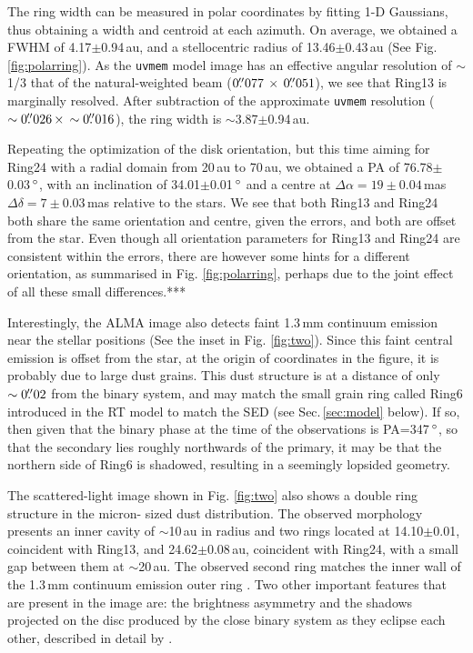 \documentclass[letters,usenatbib,times]{mnras}
\begin{document}
The ring width can be measured in polar coordinates by fitting 1-D Gaussians, thus obtaining a width and centroid at each azimuth. On average, we obtained a FWHM of 4.17$\pm$0.94\,au, and a stellocentric radius of 13.46$\pm$0.43\,au (See Fig. \ref{fig:polarring}). As the {\tt uvmem} model image has an effective angular resolution of $\sim$1/3 that of the natural-weighted beam ($0\hbox{$.\!\!^{\prime\prime}$}077 \,\times \, 0\hbox{$.\!\!^{\prime\prime}$}051$), we see that Ring13 is marginally resolved. After subtraction of the approximate {\tt uvmem} resolution ($\sim0\hbox{$.\!\!^{\prime\prime}$}026 \, \times \, \sim0\hbox{$.\!\!^{\prime\prime}$}016$), the ring width is $\sim$3.87$\pm$0.94\,au. 

Repeating the optimization of the disk orientation, but this time aiming for Ring24 with a radial domain from 20\,au to 70\,au, we obtained a PA of 76.78$\pm$0.03\,$\hbox{$^\circ$}$, with an inclination of 34.01$\pm$0.01\,$\hbox{$^\circ$}$ and a centre at $\Delta \alpha = 19\pm0.04$\,mas $\Delta \delta = 7\pm0.03$\,mas relative to the stars. We see that both Ring13 and Ring24 both share the same orientation and centre, given the errors, and both are offset from the star. Even though all orientation parameters for Ring13 and Ring24 are consistent within the errors, there are however some hints for a different orientation, as summarised in Fig. \ref{fig:polarring}, perhaps due to the joint effect of all these small differences.***

Interestingly, the ALMA image also detects faint 1.3\,mm continuum emission near the stellar positions (See the inset in Fig. \ref{fig:two}). Since this faint central emission is offset from the star, at the origin of coordinates in the figure, it is probably due to large dust grains. This dust structure is at a distance of only $\sim0\hbox{$.\!\!^{\prime\prime}$}02$ from the binary system, and may match the small grain ring called Ring6 introduced in the RT model to match the SED (see Sec.\,\ref{sec:model} below). If so, then given that the binary phase at the time of the observations is PA=347\,$\hbox{$^\circ$}$, so that the secondary lies roughly northwards of the primary, it may be that the northern side of Ring6 is shadowed, resulting in a seemingly lopsided geometry.

The scattered-light image shown in Fig. \ref{fig:two} also shows a double ring structure in the micron-
sized dust distribution. The observed morphology presents an inner cavity of $\sim$10\,au in radius and two rings located at 14.10$\pm$0.01, coincident with Ring13, and 24.62$\pm$0.08\,au, coincident with Ring24, with a small gap between them at $\sim$20\,au. The observed second ring matches the inner wall of the 1.3\,mm continuum emission outer ring \citep{Ru_z_Rodr_guez_2019}. Two other important features that are present in the image are: the brightness asymmetry and the shadows projected on the disc produced by the close binary system as they eclipse each other, described in detail by \citet{dOrazi}.
\end{document}
